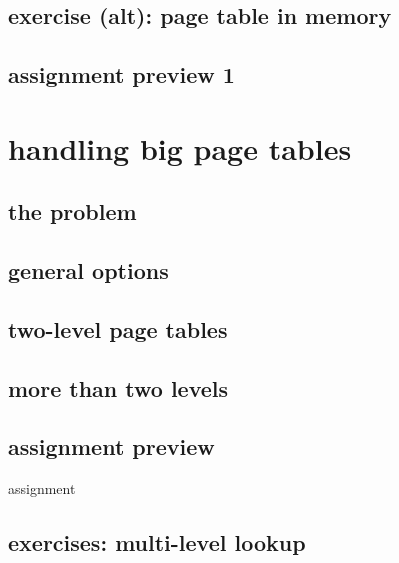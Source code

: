 \subsection{exercise (alt): page table in memory}


\subsection{assignment preview 1}





\section{handling big page tables}
\subsection{the problem}


\subsection{general options}


\subsection{two-level page tables}




\subsection{more than two levels}


\subsection{assignment preview}
\begin{frame}{assignment}
\end{frame}

\subsection{exercises: multi-level lookup}
